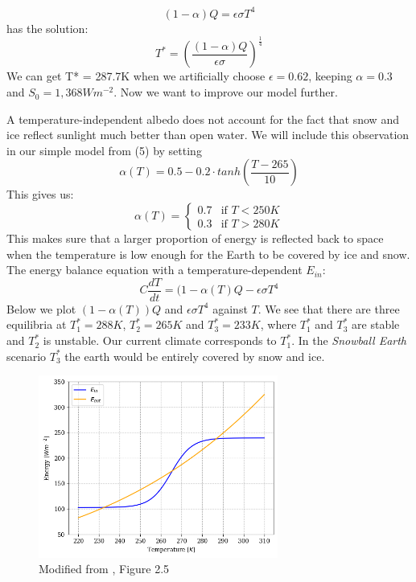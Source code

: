 \documentclass[%
thesis=student,%
coverpage=false,%
titlepage=false,%
headmarks=true, %
english,%
font=libertine, %
math=newpxtx, %
BCOR=5mm,%
coverBCOR=11mm%
]{tumbook}
\begin{document}
\begin{equation}
    (1-\alpha)Q = \epsilon \sigma T^4
\end{equation}
has the solution: 
\begin{equation}
    T^* = (\frac{(1-\alpha)Q}{\epsilon\sigma})^\frac{1}{4}
\end{equation}
We can get T* = 287.7K when we artificially choose $\epsilon = 0.62$, keeping $\alpha = 0.3$ and $S_{0} = 1,368 Wm^{-2}$. 
Now we want to improve our model further. 

A temperature-independent albedo does not account for the fact that snow and ice reflect sunlight much better than open water. We will include this observation in our simple model from (5) by setting 
\begin{equation}
    \alpha (T) = 0.5 - 0.2 \cdot tanh(\frac{T - 265}{10})
\end{equation}
This gives us: 
\[
\alpha(T) =
\begin{cases}
0.7 & \text{if } T < 250K \\
0.3 & \text{if } T > 280K
\end{cases}
\]
This makes sure that a larger proportion of energy is reflected back to space when the temperature is low enough for the Earth to be covered by ice and snow.
The energy balance equation with a temperature-dependent $E_{in}$: 
\begin{equation}
 C\frac{dT}{dt} = (1-\alpha(T)Q - \epsilon\sigma T^4
 \label{simple EBM}
\end{equation}
Below we plot $(1-\alpha(T))Q$ and $\epsilon\sigma T^4$ against $T$. We see that there are three equilibria at $T_{1}^* = 288K$, $T_{2}^* = 265K$ and $T_{3}^* = 233K$, where $T_{1}^*$ and $T_{3}^*$ are stable and $T_{2}^*$ is unstable. Our current climate corresponds to $T_{1}^*$. In the \textit{Snowball Earth} scenario $T_{3}^*$ the earth would be entirely covered by snow and ice. 

\begin{figure}
    \centering
    \includegraphics[width=0.7\textwidth]{bachelor-thesis/figures/se_multiple_equilibria.png}
    \caption{Modified from \cite{Kaper:2013}, Figure 2.5}
    \label{fig:enter-label}
\end{figure}
\end{document}
